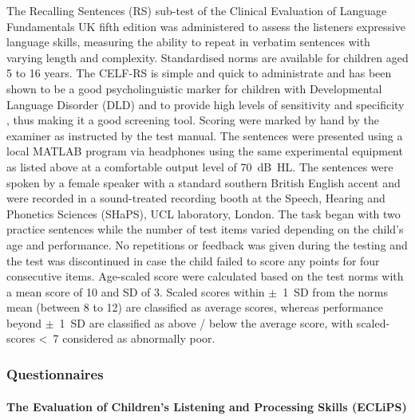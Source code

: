 \documentclass[a4paper, twoside]{templates/ociamthesis}
\begin{document}
\hfill\break
The Recalling Sentences (RS) sub-test of the Clinical Evaluation of Language Fundamentals UK fifth edition \autocite[CELF-5-UK;][]{HWiig2017} was administered to assess the listeners expressive language skills, measuring the ability to repeat in verbatim sentences with varying length and complexity. Standardised norms are available for children aged 5 to 16 years. The CELF-RS is simple and quick to administrate and has been shown to be a good psycholinguistic marker for children with Developmental Language Disorder (DLD) and to provide high levels of sensitivity and specificity \autocite{Conti-Ramsden2001}, thus making it a good screening tool. Scoring were marked by hand by the examiner as instructed by the test manual. The sentences were presented using a local MATLAB program via headphones using the same experimental equipment as listed above at a comfortable output level of 70~dB~HL. The sentences were spoken by a female speaker with a standard southern British English accent and were recorded in a sound-treated recording booth at the Speech, Hearing and Phonetics Sciences (SHaPS), UCL laboratory, London. The task began with two practice sentences while the number of test items varied depending on the child's age and performance. No repetitions or feedback was given during the testing and the test was discontinued in case the child failed to score any points for four consecutive items. Age-scaled score were calculated based on the test norms with a mean score of 10 and SD of 3. Scaled scores within \(\pm\)~1~SD from the norms mean (between 8 to 12) are classified as average scores, whereas performance beyond \(\pm\)~1~SD are classified as above / below the average score, with scaled-scores \textless~7 considered as abnormally poor.\\

\hypertarget{questionnaires}{%
\subsubsection{Questionnaires}\label{questionnaires}}

\hypertarget{the-evaluation-of-childrens-listening-and-processing-skills-eclips}{%
\paragraph{The Evaluation of Children's Listening and Processing Skills (ECLiPS)}\label{the-evaluation-of-childrens-listening-and-processing-skills-eclips}}
\end{document}
